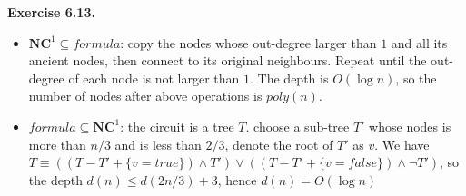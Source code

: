 \documentclass[a4paper]{article}
\newenvironment{exercise}[1]{
	\par
	\noindent\textbf{Exercise #1.}\quad
}{
	\par
	\bigskip
}
\begin{document}
\begin{exercise}{6.13}
\begin{itemize}
\item $\textbf{NC}^1 \subseteq formula$: copy the nodes  whose out-degree larger than $1$ and all its ancient nodes, then connect to its original neighbours. Repeat until the out-degree of each node is not larger than $1$. The depth is $O(\log n)$, so the number of nodes after above operations is $poly(n)$.
\item $ formula \subseteq\textbf{NC}^1$: the circuit is a tree $T$. choose a sub-tree $T'$ whose nodes is more than $n/3$ and is less than $2/3$, denote the root of $T'$ as $v$.
We have $T\equiv((T-T'+\{v=true\})\wedge T')\vee((T-T'+\{v=false\})\wedge \neg T')$, so the depth $d(n)\le d(2n/3)+3$, hence $d(n)=O(\log n)$
\end{itemize}
\end{exercise}
\end{document}
